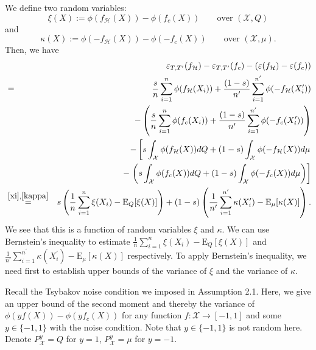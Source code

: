 \documentclass{article}
\begin{document}
We define two random variables: \begin{equation}\label{xi}
    \xi(X):= \phi(f_\mathcal{H}(X)) - \phi(f_c(X)) \qquad \text{over } (\mathcal{X}, Q)
\end{equation} and 
\begin{equation}\label{kappa}
    \kappa(X):= \phi(-f_\mathcal{H}(X))- \phi(-f_c(X))\qquad \text{over } (\mathcal{X}, \mu).
\end{equation}
Then, we have
\begin{eqnarray}\label{two_variable_function}
    && \varepsilon_{T, T^\prime}(f_\mathcal{H}) - \varepsilon_{T, T^\prime}(f_c) - (\varepsilon(f_\mathcal{H})- \varepsilon(f_c)) \nonumber\\
    &=& \frac{s}{n}\sum_{i=1}^{n}\phi(f_\mathcal{H}(X_i)) + \frac{(1-s)}{n^\prime}\sum_{i=1}^{n^\prime}\phi(-f_\mathcal{H}(X^\prime_i)) \nonumber \\
    &&-  \left(\frac{s}{n}\sum_{i=1}^{n}\phi(f_c(X_i)) + \frac{(1-s)}{n^\prime}\sum_{i=1}^{n^\prime}\phi(-f_c(X^\prime_i))\right) \nonumber\\
    && - \left[s \int_{\mathcal{X} } \phi(f_\mathcal{H}(X))dQ + (1-s)\int_{\mathcal{X} } \phi(-f_\mathcal{H}(X))d\mu \right. \nonumber \\
    &&- \left.\left(s \int_{\mathcal{X} } \phi(f_c(X))dQ + (1-s)\int_{\mathcal{X} } \phi(-f_c(X))d\mu\right)\right] \nonumber\\
    &\stackrel{\eqref{xi}, \eqref{kappa}}{=}& s \left(\frac{1}{n}\sum_{i=1}^{n} \xi(X_i) - \mathrm{E}_Q[\xi(X)]\right) + (1-s) \left(\frac{1}{n^\prime}\sum_{i=1}^{n^\prime}\kappa(X^\prime_i)- \mathrm{E}_{\mu}[\kappa(X)] \right). 
\end{eqnarray}
We see that this is a function of random variables $\xi$ and $\kappa$. We can use Bernstein's inequality to estimate $\frac{1}{n}\sum_{i=1}^{n} \xi(X_i) - \mathrm{E}_Q[\xi(X)]$ and $\frac{1}{n^\prime}\sum_{i=1}^{n^\prime}\kappa(X^\prime_i)- \mathrm{E}_{\mu}[\kappa(X)] $ respectively. To apply Bernstein's inequality, we need first to establish upper bounds of the variance of $\xi$ and the variance of $\kappa$. 

Recall the Tsybakov noise condition we imposed in Assumption 2.1.
Here, we give an upper bound of the second moment and thereby the variance of $\phi(yf(X)) - \phi(yf_c(X))$ for any function $f: \mathcal{X} \to [-1,1]$ and some $y \in \{-1,1\}$ with the noise condition.
Note that $y \in \{-1,1\}$ is not random here. 
Denote $P_\mathcal{X}^y = Q$ for $y=1$, $P_\mathcal{X}^y = \mu$ for $y=-1$.
\end{document}
